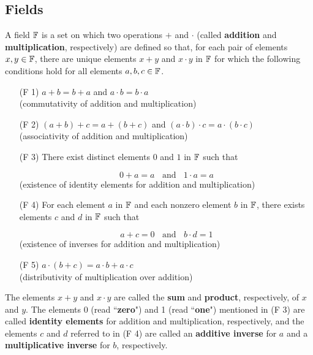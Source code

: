 \begin{alphasection}
	\setcounter{alphasect}{2}
	\section{Fields}

	\begin{definition}
		A field $\mathbb{F}$ is a set on which two operations $+$ and $\cdot$ (called \textbf{addition} and \textbf{multiplication}, respectively) are defined so that, for each pair of elements $x,y \in \mathbb{F}$, there are unique elements $x+y$ and $x \cdot y$ in $\mathbb{F}$ for which the following conditions hold for all elements $a,b,c \in \mathbb{F}$.

		\begin{enumerate}
			\item[(F 1)] $a + b = b + a$  and  $a\cdot b = b \cdot a$\\
				(commutativity of addition and multiplication)
			\item[(F 2)] $(a + b) + c = a + (b + c)$  and  $(a \cdot b)\cdot c = a \cdot (b \cdot c)$\\
				(associativity of addition and multiplication)
			\item[(F 3)] There exist distinct elements $0$ and $1$ in $\mathbb{F}$ such that

				\[0+a = a\ \ \ \ \text{and}\ \ \ \ 1\cdot a = a\]
				(existence of identity elements for addition and multiplication)

			\item[(F 4)] For each element $a$ in $\mathbb{F}$ and each nonzero element $b$ in $\mathbb{F}$, there exists elements $c$ and $d$ in $\mathbb{F}$ such that

				\[a+c = 0\ \ \ \ \text{and}\ \ \ \ b\cdot d = 1\]
				(existence of inverses for addition and multiplication)

			\item[(F 5)] $a \cdot(b + c) = a\cdot b + a \cdot c$\\
				(distributivity of multiplication over addition)
		\end{enumerate}

		The elements $x + y$ and $x \cdot y$ are called the \textbf{sum} and \textbf{product}, respectively, of $x$ and $y$. The elements $0$ (read ``\textbf{zero}") and 1 (read ``\textbf{one}") mentioned in (F 3) are called \textbf{identity elements} for addition and multiplication, respectively, and the elements $c$ and $d$ referred to in (F 4) are called an \textbf{additive inverse} for $a$ and a \textbf{multiplicative inverse} for $b$, respectively.
	\end{definition}


\end{alphasection}
